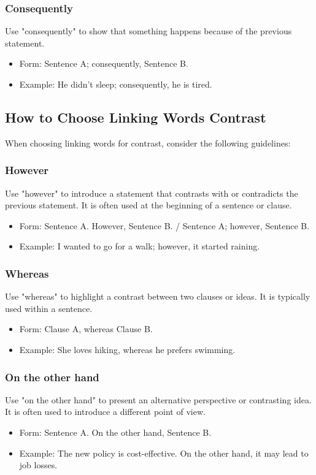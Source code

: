 \subsubsection{Consequently}
Use "consequently" to show that something happens because of the previous statement.
\begin{itemize}
    \item Form: Sentence A; consequently, Sentence B.
    \item Example: He didn't sleep; consequently, he is tired.
\end{itemize}


\subsection{How to Choose Linking Words Contrast}


When choosing linking words for contrast, consider the following guidelines:

\subsubsection{However}
Use "however" to introduce a statement that contrasts with or contradicts the previous statement. It is often used at the beginning of a sentence or clause.
\begin{itemize}
    \item Form: Sentence A. However, Sentence B. / Sentence A; however, Sentence B.
    \item Example: I wanted to go for a walk; however, it started raining.
\end{itemize}

\subsubsection{Whereas}
Use "whereas" to highlight a contrast between two clauses or ideas. It is typically used within a sentence.
\begin{itemize}
    \item Form: Clause A, whereas Clause B.
    \item Example: She loves hiking, whereas he prefers swimming.
\end{itemize}

\subsubsection{On the other hand}
Use "on the other hand" to present an alternative perspective or contrasting idea. It is often used to introduce a different point of view.
\begin{itemize}
    \item Form: Sentence A. On the other hand, Sentence B.
    \item Example: The new policy is cost-effective. On the other hand, it may lead to job losses.
\end{itemize}


